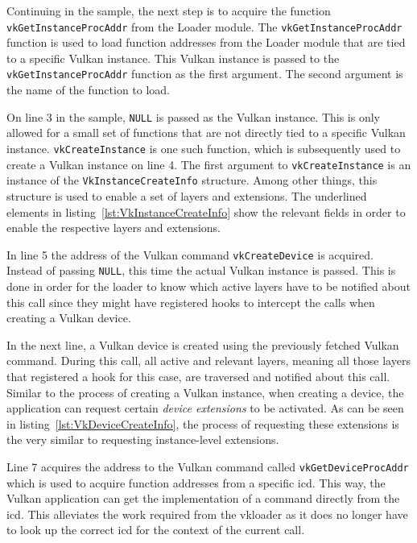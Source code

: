     Continuing in the sample, the next step is to acquire the function \lstinline{vkGetInstanceProcAddr} from the Loader module.
    The \lstinline{vkGetInstanceProcAddr} function is used to load function addresses from the Loader module that are tied to a specific Vulkan instance.
    This Vulkan instance is passed to the \lstinline{vkGetInstanceProcAddr} function as the first argument.
    The second argument is the name of the function to load.

    On line 3 in the sample, \lstinline{NULL} is passed as the Vulkan instance.
    This is only allowed for a small set of functions that are not directly tied to a specific Vulkan instance.
    \lstinline{vkCreateInstance} is one such function, which is subsequently used to create a Vulkan instance on line 4.
    The first argument to \lstinline{vkCreateInstance} is an instance of the \lstinline{VkInstanceCreateInfo} structure.
    Among other things, this structure is used to enable a set of layers and extensions.
    The underlined elements in listing~\ref{lst:VkInstanceCreateInfo} show the relevant fields in order to enable the respective layers and extensions.

    In line 5 the address of the Vulkan command \lstinline{vkCreateDevice} is acquired.
    Instead of passing \lstinline{NULL}, this time the actual Vulkan instance is passed.
    This is done in order for the loader to know which active layers have to be notified about this call since they might have registered hooks to intercept the calls when creating a Vulkan device.

    In the next line, a Vulkan device is created using the previously fetched Vulkan command.
    During this call, all active and relevant layers, meaning all those layers that registered a hook for this case, are traversed and notified about this call.
    Similar to the process of creating a Vulkan instance, when creating a device, the application can request certain \textit{device extensions} to be activated.
    As can be seen in listing~\ref{lst:VkDeviceCreateInfo}, the process of requesting these extensions is the very similar to requesting instance-level extensions.

    Line 7 acquires the address to the Vulkan command called \lstinline{vkGetDeviceProcAddr} which is used to acquire function addresses from a specific \gls{icd}.
    This way, the Vulkan application can get the implementation of a command directly from the \gls{icd}.
    This alleviates the work required from the \gls{vkloader} as it does no longer have to look up the correct \gls{icd} for the context of the current call.

